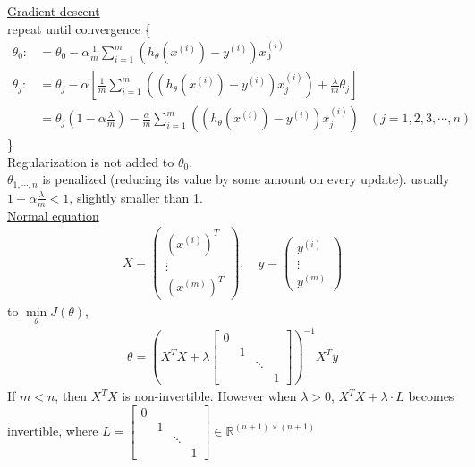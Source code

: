 \underline{Gradient descent}\\
repeat until convergence \{ \\
\begin{align*} 
\theta_0: &= \theta_0 - \alpha \frac{1}{m} \sum_{i=1}^m (h_\theta(x^{(i)}) - y^{(i)})x_0^{(i)}\\
\theta_j: &= \theta_j - \alpha \left[ \frac{1}{m} \sum_{i=1}^m ((h_\theta(x^{(i)}) - y^{(i)})x^{(i)}_j) + \frac{\lambda}{m}\theta_j \right]\\
	     &= \theta_j(1-\alpha\frac{\lambda}{m}) - \frac{\alpha}{m} \sum_{i=1}^m ((h_\theta(x^{(i)}) - y^{(i)})x^{(i)}_j)
&(j=1, 2, 3, \cdots, n)
\end{align*}
\}\\
Regularization is not added to $\theta_0$.\\
$\theta_{1, \cdots, n}$ is penalized (reducing its value by some amount on every update). usually $1-\alpha\frac{\lambda}{m} < 1$, slightly smaller than 1.\\
\underline{Normal equation}\\
\begin{align*}
X = \begin{pmatrix} (x^{(i)})^T \\ \vdots \\ (x^{(m)})^T \end{pmatrix}, \quad y = \begin{pmatrix} y^{(i)} \\ \vdots \\ y^{(m)} \end{pmatrix}
\end{align*}
to $\underset{\theta}{\min}J(\theta)$,\\
\begin{align}
\theta = (X^TX + \lambda
\begin{bmatrix}
   0 &  &  & \\ 
   & 1 &  & \\ 
   &  &  \ddots & \\ 
   &  &   & 1
\end{bmatrix})^{-1}X^Ty
\end{align}
If $m<n$, then $X^TX$ is non-invertible.
However when $\lambda > 0$, $X^TX+\lambda \cdot L$ becomes invertible, where 
$L = \begin{bmatrix}
   0 &  &  & \\ 
   & 1 &  & \\ 
   &  &  \ddots & \\ 
   &  &   & 1
\end{bmatrix} \in \mathbb{R}^{(n+1)\times(n+1)}$

